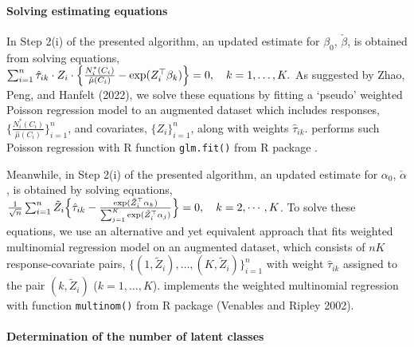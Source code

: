\hypertarget{solving-estimating-equations}{%
\paragraph{Solving estimating equations}\label{solving-estimating-equations}}

In Step 2(i) of the presented algorithm, an updated estimate for \(\beta_0\), \(\check\beta\), is obtained from
solving equations,
\(\sum _{i = 1} ^{n} \hat{\tau} _{ik} \cdot Z_i \cdot \Bigl\{ \frac{N _{i} ^{*} (C _i )}{\hat{\mu} (C_i)} - \exp (Z_i ^{\top} \beta _k ) \Bigr\} = 0 , \quad k = 1, \dots, K.\)
As suggested by Zhao, Peng, and Hanfelt (2022), we solve these equations by fitting a
`pseudo' weighted Poisson regression model to an augmented dataset which includes responses,
\(\{\frac{N _{i} ^{*} (C _i )}{\hat{\mu} (C_i)}\}_{i=1}^n\), and covariates, \(\{Z_i\}_{i=1}^n\),
along with weights \(\hat{\tau}_{ik}\).  performs such Poisson regression with R function \texttt{glm.fit()} from R package .

Meanwhile, in Step 2(i) of the presented algorithm, an updated estimate for \(\alpha_0\), \(\check{\alpha}\), is
obtained by solving equations,
\(\frac{1}{\sqrt{n}} \sum _{i =1} ^{n} \tilde{Z}_i \Bigl\{ \hat{\tau} _{ik} - \frac{\exp(\tilde{Z} _{i} ^{\top} \alpha _{k}) }{\sum _{j = 1} ^{K} \exp(\tilde{Z} _{i} ^{\top} \alpha _{j})} \Bigr\} = 0, \quad k = 2, \cdots, K\).
To solve these equations, we use an alternative and yet equivalent approach that fits weighted multinomial regression model on an augmented dataset, which consists of \(nK\) response-covariate pairs, \(\{(1, \tilde Z_i),\ldots, (K, \tilde Z_i)\}_{i=1}^n\) with weight \(\hat\tau_{ik}\) assigned to the pair \((k, \tilde Z_i)\) (\(k=1,\ldots, K\)).  implements the weighted multinomial regression with function \texttt{multinom()} from R package  (Venables and Ripley 2002).

\hypertarget{determination-of-the-number-of-latent-classes}{%
\paragraph{Determination of the number of latent classes}\label{determination-of-the-number-of-latent-classes}}

